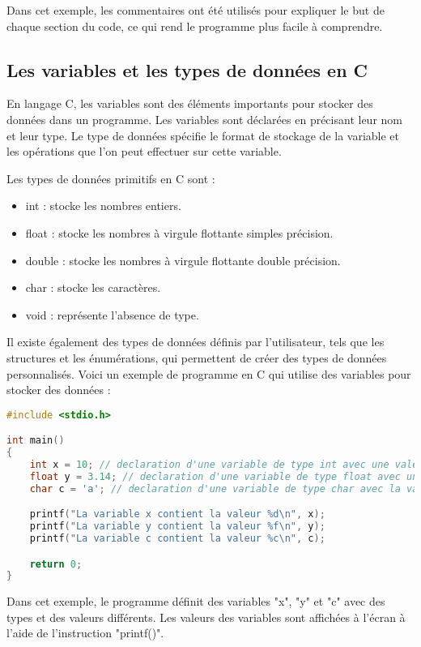 \documentclass{uofa-eng-assignment}
\begin{document}
\noindent \newline
Dans cet exemple, les commentaires ont été utilisés pour expliquer le but de chaque section du code, ce qui rend le programme plus facile à comprendre.

\subsection{Les variables et les types de données en C}
En langage C, les variables sont des éléments importants pour stocker des données dans un programme. Les variables sont déclarées en précisant leur nom et leur type. Le type de données spécifie le format de stockage de la variable et les opérations que l'on peut effectuer sur cette variable.

\noindent \newline
Les types de données primitifs en C sont :
\begin{itemize}
    \item int : stocke les nombres entiers.
    \item float : stocke les nombres à virgule flottante simples précision.
    \item double : stocke les nombres à virgule flottante double précision.
    \item char : stocke les caractères.
    \item void : représente l'absence de type.
\end{itemize}
\noindent \newline
Il existe également des types de données définis par l'utilisateur, tels que les structures et les énumérations, qui permettent de créer des types de données personnalisés.
\newline \newline
Voici un exemple de programme en C qui utilise des variables pour stocker des données :

\begin{lstlisting}[language=C]
#include <stdio.h>

int main()
{
    int x = 10; // declaration d'une variable de type int avec une valeur de 10
    float y = 3.14; // declaration d'une variable de type float avec une valeur de 3.14
    char c = 'a'; // declaration d'une variable de type char avec la valeur 'a'

    printf("La variable x contient la valeur %d\n", x);
    printf("La variable y contient la valeur %f\n", y);
    printf("La variable c contient la valeur %c\n", c);

    return 0;
}
\end{lstlisting}
\noindent \newline
Dans cet exemple, le programme définit des variables "x", "y" et "c" avec des types et des valeurs différents. Les valeurs des variables sont affichées à l'écran à l'aide de l'instruction "printf()".
\end{document}

